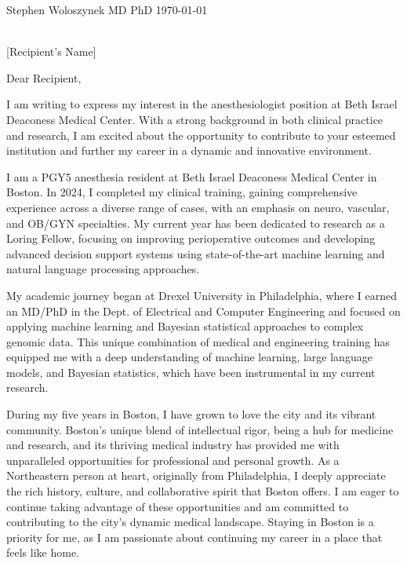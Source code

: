 \documentclass[12pt]{letter}
\newcommand{\recip}{Recipient}
\newcommand{\dept}{Dept. of Anesthesia}
\newcommand{\hosp}{Beth Israel Deaconess Medical Center}
\newcommand{\addr}{330 Brookline Ave \\ Boston, MA 02215}
\begin{document}
\date{}

\begin{letter}{
\normalsize{Stephen Woloszynek MD PhD} \hfill \normalsize{\today} \\
\vspace{.1cm}
\fontsize{8.5}{10}\selectfont{
235 Old Colony Ave. Unit 224 \\
Boston, MA, 02127 \\
(215) 910-0152 \\
stephenwoloszynek@gmail.com} \\

\vspace{1cm}

\normalsize{[Recipient's Name]} \\
\vspace{.1cm}
\fontsize{8.5}{10}\selectfont{\dept \\
\hosp \\
\addr}
}

\opening{Dear \recip,}
\vspace{.2cm}
I am writing to express my interest in the anesthesiologist position at \hosp. With a strong background in both clinical practice and research, I am excited about the opportunity to contribute to your esteemed institution and further my career in a dynamic and innovative environment.

I am a PGY5 anesthesia resident at Beth Israel Deaconess Medical Center in Boston. In 2024, I completed my clinical training, gaining comprehensive experience across a diverse range of cases, with an emphasis on neuro, vascular, and OB/GYN specialties. My current year has been dedicated to research as a Loring Fellow, focusing on improving perioperative outcomes and developing advanced decision support systems using state-of-the-art machine learning and natural language processing approaches.

My academic journey began at Drexel University in Philadelphia, where I earned an MD/PhD in the Dept. of Electrical and Computer Engineering and focused on applying machine learning and Bayesian statistical approaches to complex genomic data. This unique combination of medical and engineering training has equipped me with a deep understanding of machine learning, large language models, and Bayesian statistics, which have been instrumental in my current research. 

During my five years in Boston, I have grown to love the city and its vibrant community. Boston’s unique blend of intellectual rigor, being a hub for medicine and research, and its thriving medical industry has provided me with unparalleled opportunities for professional and personal growth. As a Northeastern person at heart, originally from Philadelphia, I deeply appreciate the rich history, culture, and collaborative spirit that Boston offers. I am eager to continue taking advantage of these opportunities and am committed to contributing to the city’s dynamic medical landscape. Staying in Boston is a priority for me, as I am passionate about continuing my career in a place that feels like home.


\end{letter}
\end{document}
